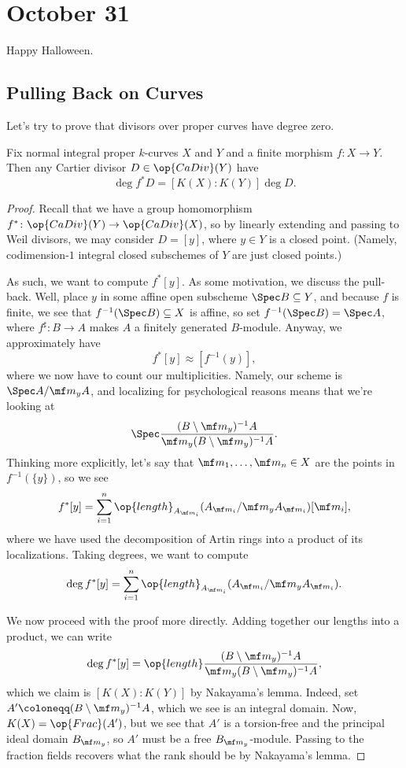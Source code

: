 \documentclass[../notes.tex]{subfiles}
\begin{document}
\section{October 31}

Happy Halloween.

\subsection{Pulling Back on Curves}
Let's try to prove that divisors over proper curves have degree zero.
\begin{proposition}
	Fix normal integral proper $k$-curves $X$ and $Y$ and a finite morphism $f\colon X\to Y$. Then any Cartier divisor $D\in\op{CaDiv}(Y)$ have
	\[\deg f^*D=[K(X):K(Y)]\deg D.\]
\end{proposition}
\begin{proof}
	Recall that we have a group homomorphism $f^*\colon\op{CaDiv}(Y)\to\op{CaDiv}(X)$, so by linearly extending and passing to Weil divisors, we may consider $D=[y]$, where $y\in Y$ is a closed point. (Namely, codimension-$1$ integral closed subschemes of $Y$ are just closed points.)

	As such, we want to compute $f^*[y]$. As some motivation, we discuss the pull-back. Well, place $y$ in some affine open subscheme $\Spec B\subseteq Y$, and because $f$ is finite, we see that $f^{-1}(\Spec B)\subseteq X$ is affine, so set $f^{-1}(\Spec B)=\Spec A$, where $f^\sharp\colon B\to A$ makes $A$ a finitely generated $B$-module. Anyway, we approximately have
	\[f^*[y]\approx\left[f^{-1}(y)\right],\]
	where we now have to count our multiplicities. Namely, our scheme is $\Spec A/\mf m_yA$, and localizing for psychological reasons means that we're looking at
	\[\Spec\frac{(B\setminus\mf m_y)^{-1}A}{\mf m_y(B\setminus\mf m_y)^{-1}A}.\]
	Thinking more explicitly, let's say that $\mf m_1,\ldots,\mf m_n\in X$ are the points in $f^{-1}(\{y\})$, so we see
	\[f^*[y]=\sum_{i=1}^n\op{length}_{A_{\mf m_i}}(A_{\mf m_i}/\mf m_yA_{\mf m_i})[\mf m_i],\]
	where we have used the decomposition of Artin rings into a product of its localizations. Taking degrees, we want to compute
	\[\deg f^*[y]=\sum_{i=1}^n\op{length}_{A_{\mf m_i}}(A_{\mf m_i}/\mf m_yA_{\mf m_i}).\]

	We now proceed with the proof more directly. Adding together our lengths into a product, we can write
	\[\deg f^*[y]=\op{length}\frac{(B\setminus\mf m_y)^{-1}A}{\mf m_y(B\setminus\mf m_y)^{-1}A},\]
	which we claim is $[K(X):K(Y)]$ by Nakayama's lemma. Indeed, set $A'\coloneqq(B\setminus\mf m_y)^{-1}A$, which we see is an integral domain. Now, $K(X)=\op{Frac}(A')$, but we see that $A'$ is a torsion-free and the principal ideal domain $B_{\mf m_y}$, so $A'$ must be a free $B_{\mf m_y}$-module. Passing to the fraction fields recovers what the rank should be by Nakayama's lemma.
\end{proof}
\end{document}
